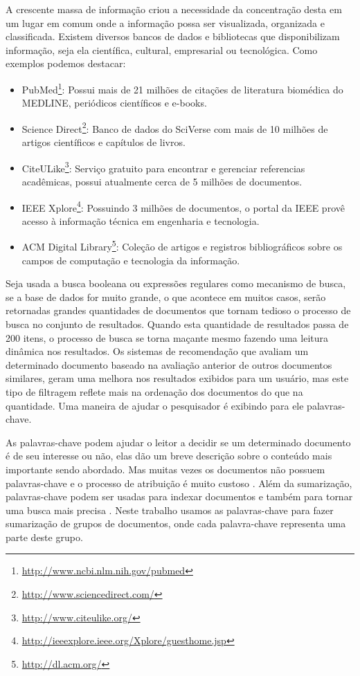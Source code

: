 A crescente massa de informação criou a necessidade da concentração desta em um lugar em comum onde a informação possa ser visualizada, organizada e classificada. Existem diversos bancos de dados e bibliotecas que disponibilizam informação, seja ela científica, cultural, empresarial ou tecnológica. Como exemplos podemos destacar:
\begin{itemize}
    \item PubMed\footnote{\href{http://www.ncbi.nlm.nih.gov/pubmed}{http://www.ncbi.nlm.nih.gov/pubmed}}:
    Possui mais de 21 milhões de citações de literatura biomédica do MEDLINE, periódicos científicos e e-books.
    \item Science Direct\footnote{\href{http://www.sciencedirect.com/}{http://www.sciencedirect.com/}}:
    Banco de dados do SciVerse com mais de 10 milhões de artigos científicos e capítulos de livros.
    \item CiteULike\footnote{\href{http://www.citeulike.org/}{http://www.citeulike.org/}}:
    Serviço gratuito para encontrar e gerenciar referencias acadêmicas, possui atualmente cerca de 5 milhões de documentos.
    \item IEEE Xplore\footnote{\href{http://ieeexplore.ieee.org/Xplore/guesthome.jsp}{http://ieeexplore.ieee.org/Xplore/guesthome.jsp}}:
    Possuindo 3 milhões de documentos, o portal da IEEE provê acesso à informação técnica em engenharia e tecnologia.
    \item ACM Digital Library\footnote{\href{http://dl.acm.org/}{http://dl.acm.org/}}:
    Coleção de artigos e registros bibliográficos sobre os campos de computação e tecnologia da informação.
\end{itemize}

Seja usada a busca booleana ou expressões regulares como mecanismo de busca, se a base de dados for muito grande, o que acontece em muitos casos, serão retornadas grandes quantidades de documentos que tornam tedioso o processo de busca no conjunto de resultados. Quando esta quantidade de resultados passa de 200 itens, o processo de busca se torna maçante mesmo fazendo uma leitura dinâmica nos resultados. Os sistemas de recomendação que avaliam um determinado documento baseado na avaliação anterior de outros documentos similares, geram uma melhora nos resultados exibidos para um usuário, mas este tipo de filtragem reflete mais na ordenação dos documentos do que na quantidade. Uma maneira de ajudar o pesquisador é exibindo para ele palavras-chave.

As palavras-chave podem ajudar o leitor a decidir se um determinado documento é de seu interesse ou não, elas dão um breve descrição sobre o conteúdo mais importante sendo abordado. Mas muitas vezes os documentos não possuem palavras-chave e o processo de atribuição é muito custoso \cite{Lui2007}. Além da sumarização, palavras-chave podem ser usadas para indexar documentos e também para tornar uma busca mais precisa \cite{Turney1999}. Neste trabalho usamos as palavras-chave para fazer sumarização de grupos de documentos, onde cada palavra-chave representa uma parte deste grupo.


